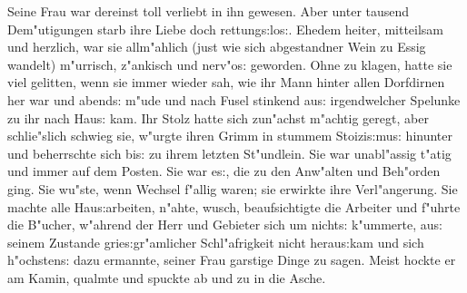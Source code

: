\documentclass[oneside,12pt]{book}
\newcommand{\s}{s:}%
\begin{document}
Seine Frau war dereinst toll verliebt in ihn gewesen. Aber unter
tausend Dem"utigungen starb ihre Liebe doch rettung{\s}lo{\s}.
Ehedem heiter, mitteilsam und herzlich, war sie allm"ahlich (just
wie sich abgestandner Wein zu Essig wandelt) m"urrisch, z"ankisch
und nerv"o{\s} geworden. Ohne zu klagen, hatte sie viel gelitten,
wenn sie immer wieder sah, wie ihr Mann hinter allen Dorfdirnen
her war und abend{\s} m"ude und nach Fusel stinkend au{\s}
irgendwelcher Spelunke zu ihr nach Hau{\s} kam. Ihr Stolz hatte
sich zun"achst m"achtig geregt, aber schlie"slich schwieg sie,
w"urgte ihren Grimm in stummem Stoizi{\s}mu{\s} hinunter und
beherrschte sich bi{\s} zu ihrem letzten St"undlein. Sie war
unabl"assig t"atig und immer auf dem Posten. Sie war e{\s}, die zu
den Anw"alten und Beh"orden ging. Sie wu"ste, wenn Wechsel f"allig
waren; sie erwirkte ihre Verl"angerung. Sie machte alle
Hau{\s}arbeiten, n"ahte, wusch, beaufsichtigte die Arbeiter und
f"uhrte die B"ucher, w"ahrend der Herr und Gebieter sich um
nicht{\s} k"ummerte, au{\s} seinem Zustande grie{\s}gr"amlicher
Schl"afrigkeit nicht herau{\s}kam und sich h"ochsten{\s} dazu
ermannte, seiner Frau garstige Dinge zu sagen. Meist hockte er am
Kamin, qualmte und spuckte ab und zu in die Asche.
\end{document}
